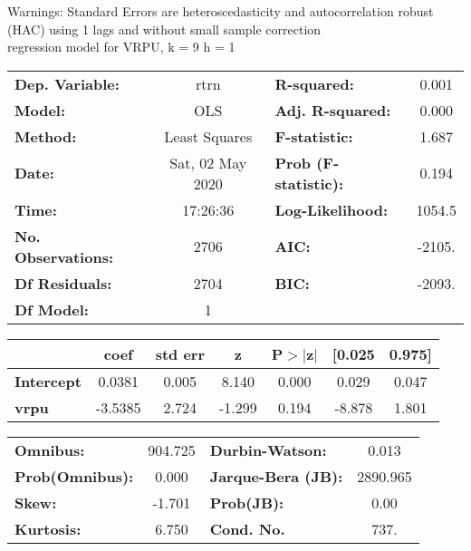 Warnings: \newline
 [1] Standard Errors are heteroscedasticity and autocorrelation robust (HAC) using 1 lags and without small sample correction\\ 

regression model for VRPU, k = 9 h = 1\begin{center}
\begin{tabular}{lclc}
\toprule
\textbf{Dep. Variable:}    &       rtrn       & \textbf{  R-squared:         } &     0.001   \\
\textbf{Model:}            &       OLS        & \textbf{  Adj. R-squared:    } &     0.000   \\
\textbf{Method:}           &  Least Squares   & \textbf{  F-statistic:       } &     1.687   \\
\textbf{Date:}             & Sat, 02 May 2020 & \textbf{  Prob (F-statistic):} &    0.194    \\
\textbf{Time:}             &     17:26:36     & \textbf{  Log-Likelihood:    } &    1054.5   \\
\textbf{No. Observations:} &        2706      & \textbf{  AIC:               } &    -2105.   \\
\textbf{Df Residuals:}     &        2704      & \textbf{  BIC:               } &    -2093.   \\
\textbf{Df Model:}         &           1      & \textbf{                     } &             \\
\bottomrule
\end{tabular}
\begin{tabular}{lcccccc}
                   & \textbf{coef} & \textbf{std err} & \textbf{z} & \textbf{P$> |$z$|$} & \textbf{[0.025} & \textbf{0.975]}  \\
\midrule
\textbf{Intercept} &       0.0381  &        0.005     &     8.140  &         0.000        &        0.029    &        0.047     \\
\textbf{vrpu}      &      -3.5385  &        2.724     &    -1.299  &         0.194        &       -8.878    &        1.801     \\
\bottomrule
\end{tabular}
\begin{tabular}{lclc}
\textbf{Omnibus:}       & 904.725 & \textbf{  Durbin-Watson:     } &    0.013  \\
\textbf{Prob(Omnibus):} &   0.000 & \textbf{  Jarque-Bera (JB):  } & 2890.965  \\
\textbf{Skew:}          &  -1.701 & \textbf{  Prob(JB):          } &     0.00  \\
\textbf{Kurtosis:}      &   6.750 & \textbf{  Cond. No.          } &     737.  \\
\bottomrule
\end{tabular}
\end{center}

